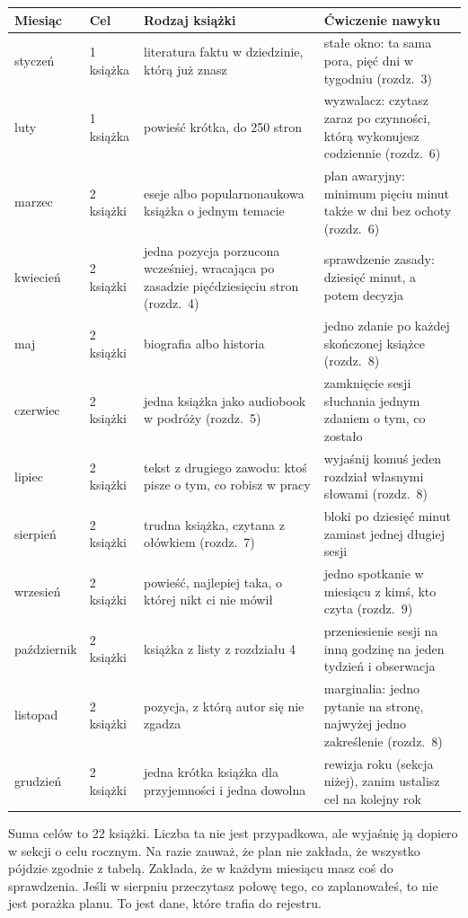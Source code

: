 \begin{center}\small
\begin{tabular}{@{}l l p{4.0cm} p{6.6cm}@{}}
\toprule
\textsf{\textbf{Miesiąc}} & \textsf{\textbf{Cel}} & \textsf{\textbf{Rodzaj książki}} & \textsf{\textbf{Ćwiczenie nawyku}}\\
\midrule
styczeń & 1 książka & literatura faktu w dziedzinie, którą już znasz & stałe okno: ta sama pora, pięć dni w tygodniu (rozdz.~3)\\
luty & 1 książka & powieść krótka, do 250 stron & wyzwalacz: czytasz zaraz po czynności, którą wykonujesz codziennie (rozdz.~6)\\
marzec & 2 książki & eseje albo popularnonaukowa książka o jednym temacie & plan awaryjny: minimum pięciu minut także w dni bez ochoty (rozdz.~6)\\
kwiecień & 2 książki & jedna pozycja porzucona wcześniej, wracająca po zasadzie pięćdziesięciu stron (rozdz.~4) & sprawdzenie zasady: dziesięć minut, a potem decyzja\\
maj & 2 książki & biografia albo historia & jedno zdanie po każdej skończonej książce (rozdz.~8)\\
czerwiec & 2 książki & jedna książka jako audiobook w podróży (rozdz.~5) & zamknięcie sesji słuchania jednym zdaniem o tym, co zostało\\
lipiec & 2 książki & tekst z drugiego zawodu: ktoś pisze o tym, co robisz w pracy & wyjaśnij komuś jeden rozdział własnymi słowami (rozdz.~8)\\
sierpień & 2 książki & trudna książka, czytana z ołówkiem (rozdz.~7) & bloki po dziesięć minut zamiast jednej długiej sesji\\
wrzesień & 2 książki & powieść, najlepiej taka, o której nikt ci nie mówił & jedno spotkanie w miesiącu z kimś, kto czyta (rozdz.~9)\\
październik & 2 książki & książka z listy z rozdziału 4 & przeniesienie sesji na inną godzinę na jeden tydzień i obserwacja\\
listopad & 2 książki & pozycja, z którą autor się nie zgadza & marginalia: jedno pytanie na stronę, najwyżej jedno zakreślenie (rozdz.~8)\\
grudzień & 2 książki & jedna krótka książka dla przyjemności i jedna dowolna & rewizja roku (sekcja niżej), zanim ustalisz cel na kolejny rok\\
\bottomrule
\end{tabular}
\end{center}

Suma celów to 22 książki. Liczba ta nie jest przypadkowa, ale wyjaśnię ją dopiero w sekcji o celu rocznym. Na razie zauważ, że plan nie zakłada, że wszystko pójdzie zgodnie z tabelą. Zakłada, że w każdym miesiącu masz coś do sprawdzenia. Jeśli w sierpniu przeczytasz połowę tego, co zaplanowałeś, to nie jest porażka planu. To jest dane, które trafia do rejestru.

